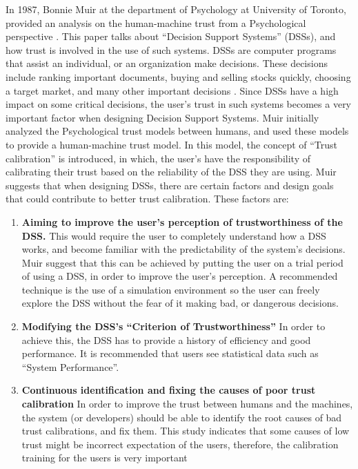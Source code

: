 \documentclass[runningheads,a4paper]{llncs}
\begin{document}
In 1987, Bonnie Muir at the department of Psychology at University of Toronto, provided an analysis on the human-machine trust from a Psychological perspective \cite{muir1987trust}. This paper talks about ``Decision Support Systems'' (DSSs), and how trust is involved in the use of such systems. DSSs are computer programs that assist an individual, or an organization make decisions. These decisions include ranking important documents, buying and selling stocks quickly, choosing a target market, and many other important decisions \cite{decisionSupportTrust}. Since DSSs have a high impact on some critical decisions, the user's trust in such systems becomes a very important factor when designing  Decision Support Systems. Muir initially analyzed the Psychological trust models between humans, and used these models to provide a human-machine trust model. In this model, the concept of ``Trust calibration'' is introduced, in which, the user's have the responsibility of calibrating their trust based on the reliability of the DSS they are using. Muir suggests that when designing DSSs, there are certain factors and design goals that could contribute to better trust calibration. These factors are:
 \begin{enumerate}
 	\item \textbf{Aiming to improve the user's perception of trustworthiness of the DSS.}
 	This would require the user to completely understand how a DSS works, and become familiar with the predictability of the system's decisions. Muir suggest that this can be achieved by putting the user on a trial period of using a DSS, in order to improve the user's perception. A recommended technique is the use of a simulation environment so the user can freely explore the DSS without the fear of it making bad, or dangerous decisions.
 	\item \textbf{Modifying the DSS's ``Criterion of Trustworthiness''}
 In order to achieve this, the DSS has to provide a history of efficiency and good performance. It is recommended that users see statistical data such as ``System Performance''.
 	\item \textbf{Continuous identification and fixing the causes of poor trust calibration}
 In order to improve the trust between humans and the machines, the system (or developers) should be able to identify the root causes of bad trust calibrations, and fix them. This study indicates that some causes of low trust might be incorrect expectation of the users, therefore, the calibration training for the users is very important
 \end{enumerate}
\end{document}
